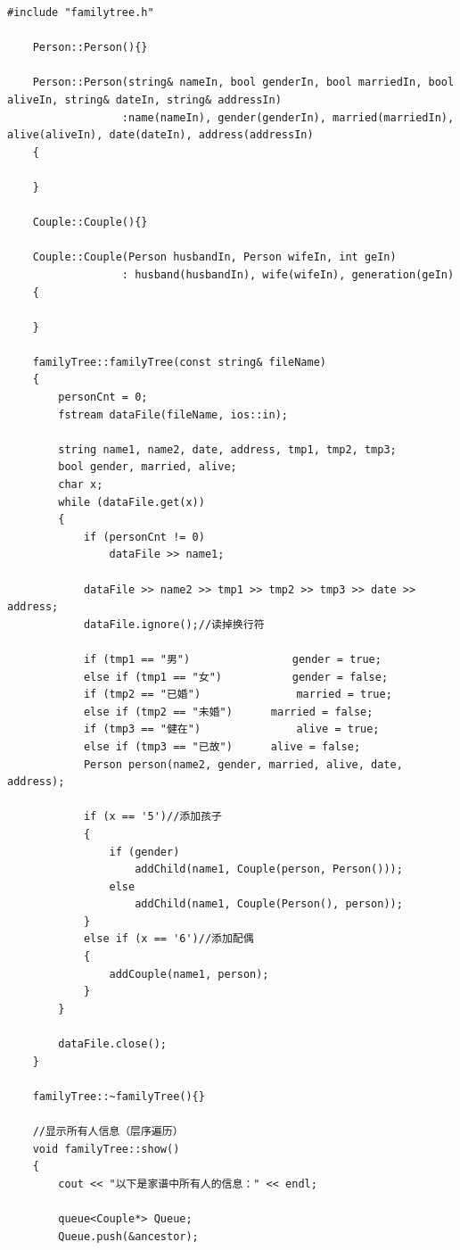 \documentclass[a4paper,11pt,UTF8]{ctexart}
\begin{document}
\begin{lstlisting}[caption=familytree.cpp,captionpos=b]
    #include "familytree.h"

    Person::Person(){}

    Person::Person(string& nameIn, bool genderIn, bool marriedIn, bool aliveIn, string& dateIn, string& addressIn)
                  :name(nameIn), gender(genderIn), married(marriedIn), alive(aliveIn), date(dateIn), address(addressIn)
    {

    }

    Couple::Couple(){}

    Couple::Couple(Person husbandIn, Person wifeIn, int geIn)
                  : husband(husbandIn), wife(wifeIn), generation(geIn)
    {

    }

    familyTree::familyTree(const string& fileName)
    {
        personCnt = 0;
        fstream dataFile(fileName, ios::in);

        string name1, name2, date, address, tmp1, tmp2, tmp3;
        bool gender, married, alive;
        char x;
        while (dataFile.get(x))
        {
            if (personCnt != 0)
                dataFile >> name1;

            dataFile >> name2 >> tmp1 >> tmp2 >> tmp3 >> date >> address;
            dataFile.ignore();//读掉换行符

            if (tmp1 == "男")				gender = true;
            else if (tmp1 == "女")			gender = false;
            if (tmp2 == "已婚")				married = true;
            else if (tmp2 == "未婚")		married = false;
            if (tmp3 == "健在")				alive = true;
            else if (tmp3 == "已故")		alive = false;
            Person person(name2, gender, married, alive, date, address);

            if (x == '5')//添加孩子
            {
                if (gender)
                    addChild(name1, Couple(person, Person()));
                else
                    addChild(name1, Couple(Person(), person));
            }
            else if (x == '6')//添加配偶
            {
                addCouple(name1, person);
            }
        }

        dataFile.close();
    }

    familyTree::~familyTree(){}

    //显示所有人信息（层序遍历）
    void familyTree::show()
    {
        cout << "以下是家谱中所有人的信息：" << endl;

        queue<Couple*> Queue;
        Queue.push(&ancestor);


\end{lstlisting}
\end{document}
